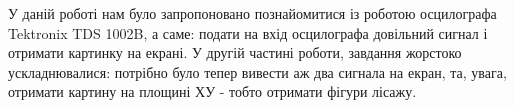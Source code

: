 
У даній роботі нам було запропоновано познайомитися із роботою осцилографа Tektronix TDS 1002B, а саме: подати на вхід осцилографа довільний сигнал і отримати картинку на екрані. У другій частині роботи, завдання жорстоко ускладнювалися: потрібно було тепер вивести аж два сигнала на екран, та, увага, отримати картину на площині ХУ - тобто отримати фігури лісажу.